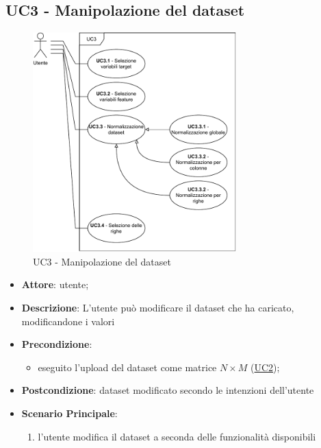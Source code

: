 \subsection{UC3 - Manipolazione del dataset}
\label{uc3}

\begin{figure}[htbp]
        \centering
        \includegraphics[width=0.7\textwidth]{source/sections/casi-uso/diagrams/uc3.pdf}
        \caption{UC3 - Manipolazione del dataset}
        \label{fig:uc3}
    \end{figure}
    
    
\begin{itemize}
    \item \textbf{Attore}: utente;
    \item \textbf{Descrizione}: L'utente può modificare il dataset che ha caricato, modificandone i valori 
    \item \textbf{Precondizione}:
    \begin{itemize}
        \item eseguito l'upload del dataset come matrice $N\times M$ (\hyperref[uc2]{UC2});
    \end{itemize}
    \item \textbf{Postcondizione}: dataset modificato secondo le intenzioni dell'utente
    \item \textbf{Scenario Principale}: 
    \begin{enumerate}
        \item l'utente modifica il dataset a seconda delle funzionalità disponibili
    \end{enumerate}  
    \end{itemize}


